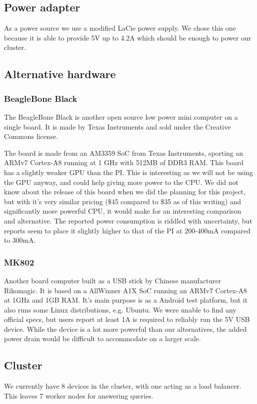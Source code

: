 \subsection{Power adapter}
As a power source we use a modified LaCie power supply. We chose this one because it is able to provide 5V up to 4.2A which should be enough to power our cluster. 

\subsection{Alternative hardware}

\subsubsection{BeagleBone Black}
The BeagleBone Black is another open source low power mini computer on a single board. It is made by Texas Instruments and sold under the Creative Commons license.

The board is made from an AM3359 SoC from Texas Instruments, sporting an ARMv7 Cortex-A8 running at 1 GHz with 512MB of DDR3 RAM. This board has a slightly weaker GPU than the PI. This is interesting as we will not be using the GPU anyway, and could help giving more power to the CPU.
We did not know about the release of this board when we did the planning for this project, but with it's very similar pricing (\$45 compared to \$35 as of this writing) and significantly more powerful CPU, it would make for an interesting comparison and alternative. The reported power consumption is riddled with uncertainty, but reports seem to place it slightly higher to that of the PI at 200-400mA compared to 300mA.

\subsubsection{MK802}
Another board computer built as a USB stick by Chinese manufacturer Rikomagic.
It is based on a AllWinner A1X SoC running an ARMv7 Cortex-A8 at 1GHz and 1GB RAM. It's main purpose is as a Android test platform, but it also runs some Linux distributions, e.g. Ubuntu.
We were unable to find any official specs, but users report at least 1A is required to reliably run the 5V USB device. While the device is a lot more powerful than our alternatives, the added power drain would be difficult to accommodate on a larger scale.

\subsection{Cluster}
We currently have 8 devices in the cluster, with one acting as a load balancer. This leaves 7 worker nodes for answering queries.

